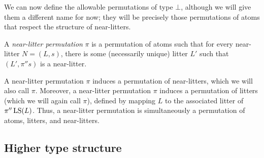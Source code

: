 We can now define the allowable permutations of type \( \bot \), although we will give them a different name for now; they will be precisely those permutations of atoms that respect the structure of near-litters.
\begin{definition}
    A \emph{near-litter permutation} \( \pi \) is a permutation of atoms such that for every near-litter \( N = (L, s) \), there is some (necessarily unique) litter \( L' \) such that \( (L', \pi '' s) \) is a near-litter.
\end{definition}
A near-litter permutation \( \pi \) induces a permutation of near-litters, which we will also call \( \pi \).
Moreover, a near-litter permutation \( \pi \) induces a permutation of litters (which we will again call \( \pi \)), defined by mapping \( L \) to the associated litter of \( \pi '' \operatorname{LS}(L) \).
Thus, a near-litter permutation is simultaneously a permutation of atoms, litters, and near-litters.

\subsection{Higher type structure}

